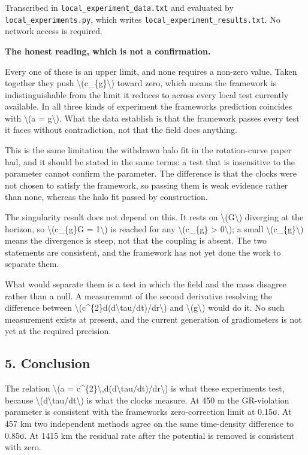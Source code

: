 \documentclass[
  10pt,
]{article}
\begin{document}
Transcribed in \texttt{local\_experiment\_data.txt} and evaluated by
\texttt{local\_experiments.py}, which writes
\texttt{local\_experiment\_results.txt}. No network access is required.

\textbf{The honest reading, which is not a confirmation.}

Every one of these is an upper limit, and none requires a non-zero
value. Taken together they push \textbackslash(c\_\{g\}\textbackslash)
toward zero, which means the framework is indistinguishable from the
limit it reduces to across every local test currently available. In all
three kinds of experiment the framework\textquotesingle s prediction
coincides with \textbackslash(a = g\textbackslash). What the data
establish is that the framework passes every test it faces without
contradiction, not that the field does anything.

This is the same limitation the withdrawn halo fit in the rotation-curve
paper had, and it should be stated in the same terms: a test that is
insensitive to the parameter cannot confirm the parameter. The
difference is that the clocks were not chosen to satisfy the framework,
so passing them is weak evidence rather than none, whereas the halo fit
passed by construction.

The singularity result does not depend on this. It rests on
\textbackslash(G\textbackslash) diverging at the horizon, so
\textbackslash(c\_\{g\}G = 1\textbackslash) is reached for any
\textbackslash(c\_\{g\} \textgreater{} 0\textbackslash); a small
\textbackslash(c\_\{g\}\textbackslash) means the divergence is steep,
not that the coupling is absent. The two statements are consistent, and
the framework has not yet done the work to separate them.

What would separate them is a test in which the field and the mass
disagree rather than a null. A measurement of the second derivative
resolving the difference between
\textbackslash(c\^{}\{2\}d(d\textbackslash tau/dt)/dr\textbackslash) and
\textbackslash(g\textbackslash) would do it. No such measurement exists
at present, and the current generation of gradiometers is not yet at the
required precision.

\hypertarget{conclusion}{%
\subsection{5. Conclusion}\label{conclusion}}

The relation \textbackslash(a =
c\^{}\{2\}\textbackslash,d(d\textbackslash tau/dt)/dr\textbackslash) is
what these experiments test, because
\textbackslash(d\textbackslash tau/dt\textbackslash) is what the clocks
measure. At 450 m the GR-violation parameter is consistent with the
framework\textquotesingle s zero-correction limit at 0.15σ. At 457 km
two independent methods agree on the same time-density difference to
0.85σ. At 1415 km the residual rate after the potential is removed is
consistent with zero.
\end{document}
